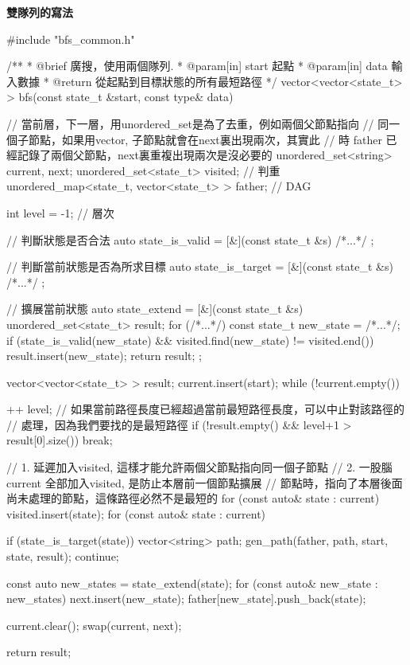 \textbf{雙隊列的寫法}

\begin{Codex}[label=bfs_template.cpp]
#include "bfs_common.h"

/**
 * @brief 廣搜，使用兩個隊列.
 * @param[in] start 起點
 * @param[in] data 輸入數據
 * @return 從起點到目標狀態的所有最短路徑
 */
vector<vector<state_t> > bfs(const state_t &start, const type& data) {
    // 當前層，下一層，用unordered_set是為了去重，例如兩個父節點指向
    // 同一個子節點，如果用vector, 子節點就會在next裏出現兩次，其實此
    // 時 father 已經記錄了兩個父節點，next裏重複出現兩次是沒必要的
    unordered_set<string> current, next;
    unordered_set<state_t> visited; // 判重
    unordered_map<state_t, vector<state_t> > father; // DAG

    int level = -1;  // 層次

    // 判斷狀態是否合法
    auto state_is_valid = [&](const state_t &s) { /*...*/ };

    // 判斷當前狀態是否為所求目標
    auto state_is_target = [&](const state_t &s) { /*...*/ };

    // 擴展當前狀態
    auto state_extend = [&](const state_t &s) {
        unordered_set<state_t> result;
        for (/*...*/) {
            const state_t new_state = /*...*/;
            if (state_is_valid(new_state) && 
                    visited.find(new_state) != visited.end()) {
                result.insert(new_state);
            }
        }
        return result;
    };

    vector<vector<state_t> > result;
    current.insert(start);
    while (!current.empty()) {
        ++ level;
        // 如果當前路徑長度已經超過當前最短路徑長度，可以中止對該路徑的
        // 處理，因為我們要找的是最短路徑
        if (!result.empty() && level+1 > result[0].size()) break;

        // 1. 延遲加入visited, 這樣才能允許兩個父節點指向同一個子節點
        // 2. 一股腦current 全部加入visited, 是防止本層前一個節點擴展
        // 節點時，指向了本層後面尚未處理的節點，這條路徑必然不是最短的
        for (const auto& state : current)
            visited.insert(state);
        for (const auto& state : current) {
            if (state_is_target(state)) {
                vector<string> path;
                gen_path(father, path, start, state, result);
                continue;
            }

            const auto new_states = state_extend(state);
            for (const auto& new_state : new_states) {
                next.insert(new_state);
                father[new_state].push_back(state);
            }
        }

        current.clear();
        swap(current, next);
    }

    return result;
}
\end{Codex}

